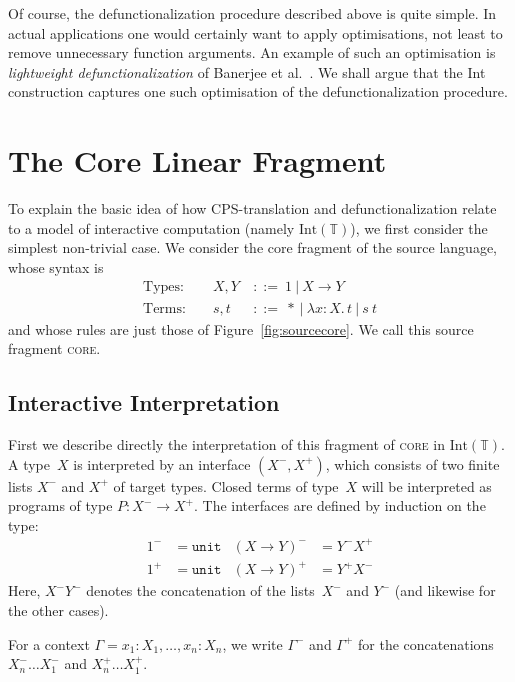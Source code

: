 \documentclass{LMCS}
\theoremstyle{definition}
\theoremstyle{plain}
\newcommand{\lollipop}{\to}
\newcommand{\unit}{\mathtt{unit}}
\newcommand{\Mid}{\ \mathrel{\big|} \ }
\newcommand{\I}[2]{#1 \colon #2}
\newcommand{\tlami}[3]{\lambda {#1}{:}{#2}.\, {#3}}
\newcommand{\TT}{\mathbb{T}}
\newcommand{\Int}[1]{\textrm{Int}(#1)}
\begin{document}
Of course, the defunctionalization procedure described above is quite 
simple. In actual applications one would certainly want to apply optimisations, 
not least to remove unnecessary function arguments. An
example of such an optimisation is \emph{lightweight
defunctionalization} of Banerjee et al.~\cite{banerjee}. 
We shall argue that the Int construction captures one such optimisation
of the defunctionalization procedure. 

\section{The Core Linear Fragment}
\label{sect:linear}

To explain the basic idea of
how CPS-translation and defunctionalization
relate to a model of interactive computation
(namely $\Int\TT$),
we first consider the simplest non-trivial case.
We consider the core fragment of the source language, whose
syntax is 
\begin{align*}
 \text{Types: } && 
 X, Y &\ ::=\ 1  \Mid X \to Y  \\
 \text{Terms: } && s, t &\ ::=\  * 
  \Mid \tlami x X t \Mid s\ t 
\end{align*}
and whose rules are just those of Figure~\ref{fig:sourcecore}.
We call this source fragment \textsc{core}.

\subsection{Interactive Interpretation}

First we describe directly the interpretation of this fragment of 
\textsc{core} in $\Int\TT$.
A type~$X$ is interpreted by an interface $(X^-,X^+)$, which consists of
two finite lists $X^-$ and $X^+$ of target types.
Closed terms of type~$X$ will be interpreted as programs
of type $P\colon X^- \to X^+$.
The interfaces are defined by induction on the type:
\begin{align*}
  1^- &= \unit
  &
  (X \lollipop Y)^- &= Y^- X^+
  \\
  1^+ &= \unit
  &
  (X \lollipop Y)^+ &= Y^+ X^-
\end{align*}
Here, $X^- Y^-$ denotes the concatenation of the lists~$X^-$ and $Y^-$ 
(and likewise for the other cases). 

For a context $\Gamma = \I {x_1} {X_1},\dots, \I {x_n} {X_n}$,
we write $\Gamma^-$ and $\Gamma^+$ for the concatenations
$X^-_n\dots X^-_1$ and
$X^+_n\dots X^+_1$.
\end{document}
